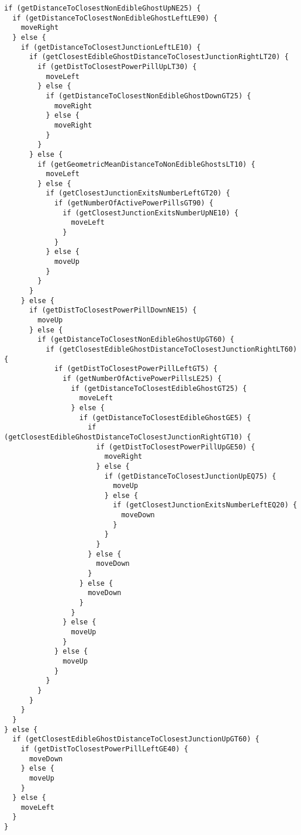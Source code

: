 \begin{lstlisting}[frame=single, breaklines=no, basicstyle=\fontsize{10}{11}\ttfamily, caption=Ejemplo de bot típico producido usando la gramática de bajo nivel entrenado contra Random Ghosts]
if (getDistanceToClosestNonEdibleGhostUpNE25) {
  if (getDistanceToClosestNonEdibleGhostLeftLE90) {
    moveRight
  } else {
    if (getDistanceToClosestJunctionLeftLE10) {
      if (getClosestEdibleGhostDistanceToClosestJunctionRightLT20) {
        if (getDistToClosestPowerPillUpLT30) {
          moveLeft
        } else {
          if (getDistanceToClosestNonEdibleGhostDownGT25) {
            moveRight
          } else {
            moveRight
          }
        }
      } else {
        if (getGeometricMeanDistanceToNonEdibleGhostsLT10) {
          moveLeft
        } else {
          if (getClosestJunctionExitsNumberLeftGT20) {
            if (getNumberOfActivePowerPillsGT90) {
              if (getClosestJunctionExitsNumberUpNE10) {
                moveLeft
              }
            }
          } else {
            moveUp
          }
        }
      }
    } else {
      if (getDistToClosestPowerPillDownNE15) {
        moveUp
      } else {
        if (getDistanceToClosestNonEdibleGhostUpGT60) {
          if (getClosestEdibleGhostDistanceToClosestJunctionRightLT60) {
            if (getDistToClosestPowerPillLeftGT5) {
              if (getNumberOfActivePowerPillsLE25) {
                if (getDistanceToClosestEdibleGhostGT25) {
                  moveLeft
                } else {
                  if (getDistanceToClosestEdibleGhostGE5) {
                    if (getClosestEdibleGhostDistanceToClosestJunctionRightGT10) {
                      if (getDistToClosestPowerPillUpGE50) {
                        moveRight
                      } else {
                        if (getDistanceToClosestJunctionUpEQ75) {
                          moveUp
                        } else {
                          if (getClosestJunctionExitsNumberLeftEQ20) {
                            moveDown
                          }
                        }
                      }
                    } else {
                      moveDown
                    }
                  } else {
                    moveDown
                  }
                }
              } else {
                moveUp
              }
            } else {
              moveUp
            }
          }
        }
      }
    }
  }
} else {
  if (getClosestEdibleGhostDistanceToClosestJunctionUpGT60) {
    if (getDistToClosestPowerPillLeftGE40) {
      moveDown
    } else {
      moveUp
    }
  } else {
    moveLeft
  }
}
\end{lstlisting}


